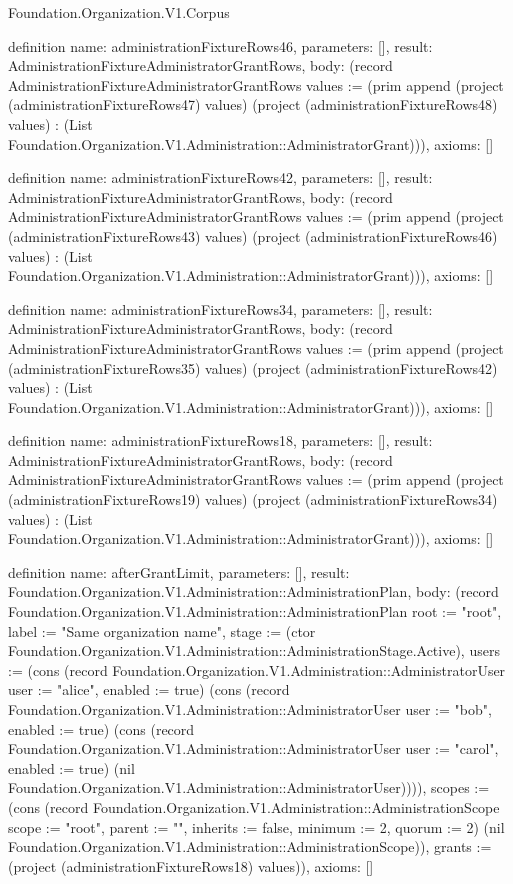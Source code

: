 \begin{lexlean}{Foundation.Organization.V1.Corpus}
\begin{semanticmodule}
definition{
  name: administrationFixtureRows46,
  parameters: [],
  result: AdministrationFixtureAdministratorGrantRows,
  body: (record AdministrationFixtureAdministratorGrantRows {values := (prim append (project (administrationFixtureRows47) values) (project (administrationFixtureRows48) values) : (List Foundation.Organization.V1.Administration::AdministratorGrant))}),
  axioms: []
}

definition{
  name: administrationFixtureRows42,
  parameters: [],
  result: AdministrationFixtureAdministratorGrantRows,
  body: (record AdministrationFixtureAdministratorGrantRows {values := (prim append (project (administrationFixtureRows43) values) (project (administrationFixtureRows46) values) : (List Foundation.Organization.V1.Administration::AdministratorGrant))}),
  axioms: []
}

definition{
  name: administrationFixtureRows34,
  parameters: [],
  result: AdministrationFixtureAdministratorGrantRows,
  body: (record AdministrationFixtureAdministratorGrantRows {values := (prim append (project (administrationFixtureRows35) values) (project (administrationFixtureRows42) values) : (List Foundation.Organization.V1.Administration::AdministratorGrant))}),
  axioms: []
}

definition{
  name: administrationFixtureRows18,
  parameters: [],
  result: AdministrationFixtureAdministratorGrantRows,
  body: (record AdministrationFixtureAdministratorGrantRows {values := (prim append (project (administrationFixtureRows19) values) (project (administrationFixtureRows34) values) : (List Foundation.Organization.V1.Administration::AdministratorGrant))}),
  axioms: []
}

definition{
  name: afterGrantLimit,
  parameters: [],
  result: Foundation.Organization.V1.Administration::AdministrationPlan,
  body: (record Foundation.Organization.V1.Administration::AdministrationPlan {root := "root", label := "Same organization name", stage := (ctor Foundation.Organization.V1.Administration::AdministrationStage.Active), users := (cons (record Foundation.Organization.V1.Administration::AdministratorUser {user := "alice", enabled := true}) (cons (record Foundation.Organization.V1.Administration::AdministratorUser {user := "bob", enabled := true}) (cons (record Foundation.Organization.V1.Administration::AdministratorUser {user := "carol", enabled := true}) (nil Foundation.Organization.V1.Administration::AdministratorUser)))), scopes := (cons (record Foundation.Organization.V1.Administration::AdministrationScope {scope := "root", parent := "", inherits := false, minimum := 2, quorum := 2}) (nil Foundation.Organization.V1.Administration::AdministrationScope)), grants := (project (administrationFixtureRows18) values)}),
  axioms: []
}


\end{semanticmodule}
\end{lexlean}
